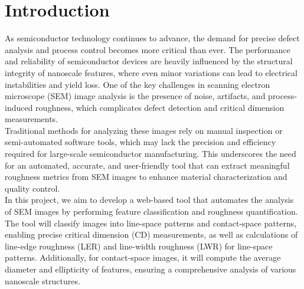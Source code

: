 \documentclass[12pt,oneside,letterpaper,english]{article}
\begin{document}
\newpage
{} 
\section{Introduction}
As semiconductor technology continues to advance, the demand for precise defect analysis and process control becomes more critical than ever. The performance and reliability of semiconductor devices are heavily influenced by the structural integrity of nanoscale features, where even minor variations can lead to electrical instabilities and yield loss. One of the key challenges in scanning electron microscope (SEM) image analysis is the presence of noise, artifacts, and process-induced roughness, which complicates defect detection and critical dimension measurements. \\

Traditional methods for analyzing these images rely on manual inspection or semi-automated software tools, which may lack the precision and efficiency required for large-scale semiconductor manufacturing. This underscores the need for an automated, accurate, and user-friendly tool that can extract meaningful roughness metrics from SEM images to enhance material characterization and quality control.\\  

In this project, we aim to develop a web-based tool that automates the analysis of SEM images by performing feature classification and roughness quantification. The tool will classify images into line-space patterns and contact-space patterns, enabling precise critical dimension (CD) measurements, as well as calculations of line-edge roughness (LER) and line-width roughness (LWR) for line-space patterns. Additionally, for contact-space images, it will compute the average diameter and ellipticity of features, ensuring a comprehensive analysis of various nanoscale structures. \\
\end{document}
